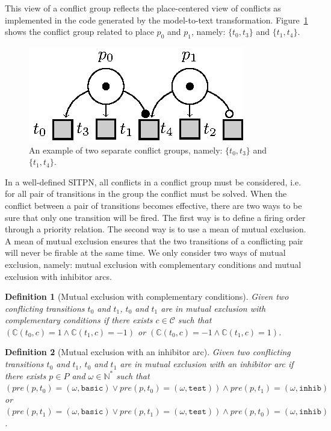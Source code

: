 \documentclass[pdflatex,sn-mathphys]{sn-jnl}%
\theoremstyle{thmstyleone}%
\theoremstyle{thmstyletwo}%
\theoremstyle{thmstylethree}%
\newtheorem{definition}{Definition}%
\begin{document}
This view of a conflict group reflects the place-centered view of
conflicts as implemented in the \vhdl{} code generated by the
model-to-text transformation.  Figure~\ref{fig:conflict-groups} shows
the conflict group related to place $p_0$ and $p_1$, namely:
$\{t_0,t_3\}$ and $\{t_1,t_4\}$.

\begin{figure}[H]
  \centering
  \includegraphics[keepaspectratio,width=.3\linewidth]{conflict-groups.eps}
  \caption[An example of two separate conflict groups.]{An example of
    two separate conflict groups, namely: $\{t_0,t_3\}$ and
    $\{t_1,t_4\}$.}
  \label{fig:conflict-groups}
\end{figure}

In a well-defined SITPN, all conflicts in a conflict group must be
considered, i.e. for all pair of transitions in the group the conflict
must be solved. When the conflict between a pair of transitions
becomes effective, there are two ways to be sure that only one
transition will be fired. The first way is to define a firing order
through a priority relation. The second way is to use a mean of mutual
exclusion. A mean of mutual exclusion ensures that the two transitions
of a conflicting pair will never be firable at the same time. We only
consider two ways of mutual exclusion, namely: mutual exclusion with
complementary conditions and mutual exclusion with inhibitor arcs.

\begin{definition}[Mutual exclusion with complementary conditions]
  \label{def:mutex-conds}
  Given two conflicting transitions $t_0$ and $t_1$, $t_0$ and $t_1$
  are in mutual exclusion with complementary conditions if there
  exists $c\in\mathcal{C}$ such that
  $(\mathbb{C}(t_0,c)=1\land{}\mathbb{C}(t_1,c)=-1)$ or
  $(\mathbb{C}(t_0,c)=-1\land{}\mathbb{C}(t_1,c)=1)$.
\end{definition}

\begin{definition}[Mutual exclusion with an inhibitor arc]
  \label{def:mutex-inhib} Given two conflicting transitions $t_0$ and
  $t_1$, $t_0$ and $t_1$ are in mutual exclusion with an inhibitor arc
  if there exists $p\in{}P$ and $\omega\in{}\mathbb{N}^{*}$ such that
  $(pre(p,t_0)=(\omega,\mathtt{basic})\lor{}pre(p,t_0)=(\omega,\mathtt{test}))\land{}pre(p,t_1)=(\omega,\mathtt{inhib})$
  or
  $(pre(p,t_1)=(\omega,\mathtt{basic})\lor{}pre(p,t_1)=(\omega,\mathtt{test}))\land{}pre(p,t_0)=(\omega,\mathtt{inhib})$.
\end{definition}
\end{document}
